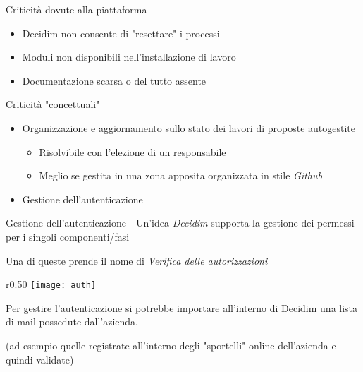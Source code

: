 \begin{frame}{Criticità dovute alla piattaforma}


  \begin{itemize}[<+- | alert@+>]

    \item Decidim non consente di "resettare" i processi
    \item Moduli non disponibili nell'installazione di lavoro
    \item Documentazione scarsa o del tutto assente
  \end{itemize}
  \centering

\end{frame}
\begin{frame}{Criticità "concettuali"}
  \begin{itemize}[<+- | alert@+>]
    \item Organizzazione e aggiornamento sullo stato dei lavori di proposte autogestite
          \begin{itemize}
            \item Risolvibile con l'elezione di un responsabile
            \item Meglio se gestita in una zona apposita organizzata in stile \emph{Github}
          \end{itemize}


    \item Gestione dell'autenticazione
  \end{itemize}

\end{frame}
\begin{frame}{Gestione dell'autenticazione - Un'idea}
  \emph{Decidim} supporta la gestione dei permessi per i singoli componenti/fasi

  Una di queste prende il nome di \emph{Verifica delle autorizzazioni}

  \begin{wrapfigure}{r}{0.50\textwidth}
    \centering
    \texttt{[image: auth]}
  \end{wrapfigure}

  Per gestire l'autenticazione si potrebbe importare all'interno di Decidim una lista di mail possedute dall'azienda.

  (ad esempio quelle registrate all'interno degli "sportelli" online dell'azienda e quindi validate)

\end{frame}
